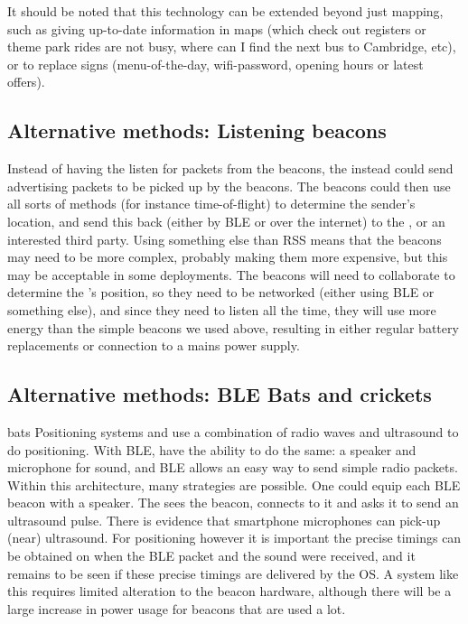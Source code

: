 It should be noted that this technology can be extended beyond just mapping, such as giving up-to-date information in maps (which check out registers or theme park rides are not busy, where can I find the next bus to Cambridge, etc), or to replace signs (menu-of-the-day, wifi-password, opening hours or latest offers). 


\subsection{Alternative methods: Listening beacons}
Instead of having the \device listen for packets from the beacons, the \device instead could send advertising packets to be picked up by the beacons.
The beacons could then use all sorts of methods (for instance time-of-flight) to determine the sender's location, and send this back (either by BLE or over the internet) to the \device, or an interested third party.
Using something else than RSS means that the beacons may need to be more complex, probably making them more expensive, but this may be acceptable in some deployments.
The beacons will need to collaborate to determine the \device's position, so they need to be networked (either using BLE or something else), and since they need to listen all the time, they will use more energy than the simple beacons we used above, resulting in either regular battery replacements or connection to a mains power supply.

\subsection{Alternative methods: BLE Bats and crickets}
\label{architecture}{bats}
Positioning systems \citep{harter2002anatomy} and \citep{priyantha2000cricket} use a combination of radio waves and ultrasound to do positioning.
With BLE, \device have the ability to do the same: a speaker and microphone for sound, and BLE allows \apps an easy way to send simple radio packets.
Within this architecture, many strategies are possible.
One could equip each BLE beacon with a speaker.
The \device sees the beacon, connects to it and asks it to send an ultrasound pulse.
There is evidence that smartphone microphones can pick-up (near) ultrasound\citep{arentz2011near,bihler2011smartguide}.
For positioning however it is important the precise timings can be obtained on when the BLE packet and the sound were received, and it remains to be seen if these precise timings are delivered by the OS.
A system like this requires limited alteration to the beacon hardware, although there will be a large increase in power usage for beacons that are used a lot.
